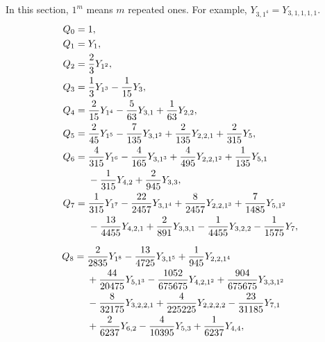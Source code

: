 \documentclass[9pt,twocolumn,twoside]{gsajnl}
\begin{document}
In this section, $1^m$ means $m$ repeated ones.  For example,
$Y_{3,1^4}=Y_{3,1,1,1,1}$.
\begin{align}
Q_0={}&1,
\label{eq:Q0-Y}\\ \nonumber
Q_1={}&Y_{1}, \\ \nonumber
Q_2={}&\frac23Y_{1^2}, \\ \nonumber
Q_3={}&\frac13Y_{1^3}-\frac1{15}Y_{3}, \\ \nonumber
Q_4={}&\frac{2}{15}Y_{1^4}-\frac5{63}Y_{3,1}+\frac1{63}Y_{2,2}, \\ \nonumber
Q_5={}&\frac{2}{45}Y_{1^5}-\frac7{135}Y_{3,1^2}+
\frac2{135}Y_{2,2,1}+\frac2{315}Y_{5}, \\ \nonumber
Q_6={}&\frac4{315}Y_{1^6}-
\frac4{165}Y_{3,1^3}+
\frac4{495}Y_{2,2,1^2}+
\frac1{135}Y_{5,1}
\notag\\ \nonumber
&-\frac1{315}Y_{4,2}+
\frac2{945}Y_{3,3}, \\ \nonumber
Q_7={}&\frac1{315}Y_{1^7}-
\frac{22}{2457}Y_{3,1^4}+
\frac8{2457}Y_{2,2,1^3}+
\frac7{1485}Y_{5,1^2}
\notag\\ \nonumber
&-\frac{13}{4455}Y_{4,2,1}+
\frac2{891}Y_{3,3,1}-
\frac1{4455}Y_{3,2,2}-
\frac1{1575}Y_{7},
\end{align}

\vspace*{-0.28cm}
\begin{equation*}
\hspace*{-0.5cm}
\begin{aligned}
Q_8={}&\frac2{2835}Y_{1^8}
-\frac{13}{4725}Y_{3,1^5}
+\frac1{945}Y_{2,2,1^4}
\\
&+\frac{44}{20475}Y_{5,1^3}
-\frac{1052}{675675}Y_{4,2,1^2}
+\frac{904}{675675}Y_{3,3,1^2}
\\
&-\frac8{32175}Y_{3,2,2,1}
+\frac4{225225}Y_{2,2,2,2}
-\frac{23}{31185}Y_{7,1}
\\
&+\frac2{6237}Y_{6,2}
-\frac4{10395}Y_{5,3}
+\frac1{6237}Y_{4,4},
\end{aligned}
\label{eq:Q8-Y}
\end{equation*}
\end{document}
